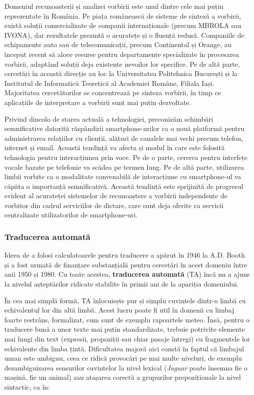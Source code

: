 \begin{multicols}{2}
Domeniul recunoașterii și analizei vorbirii este unul dintre cele mai puțin reprezentate în România. Pe piața românească de sisteme de sinteză a vorbirii, există soluții comercializate de companii internaționale (precum MBROLA sau IVONA), dar rezultatele prezintă o acuratețe și o fluență redusă. Companiile de echipamente auto sau de telecomunicații, precum Continental și Orange, au început recent să aloce resurse pentru departamente specializate în procesarea vorbirii, adaptând soluții deja existente nevoilor lor specifice. Pe de altă parte, cercetări în această direcție au loc la Universitatea Politehnica București și la Institutul de Informatică Teoretică al Academiei Române, Filiala Iași. Majoritatea cercetătorilor se concentrează pe sinteza vorbirii, în timp ce aplicațiile de interpretare a vorbirii sunt mai puțin dezvoltate.

Privind dincolo de starea actuală a tehnologiei, preconizăm schimbări semnificative datorită răspândirii smartphone-urilor ca o nouă platformă pentru administrarea relațiilor cu clienții, alături de canalele mai vechi precum telefon, internet și email. Această tendință va afecta și modul în care este folosită tehnologia pentru interacțiunea prin voce. Pe de o parte, cererea pentru interfețe vocale bazate pe telefonie va scădea pe termen lung. Pe de altă parte, utilizarea limbii vorbite ca o modalitate convenabilă de interacțiune cu smartphone-ul va căpăta o importanță semnificativă. Această tendință este sprijinită de progresul evident al acurateței sistemelor de recunoaștere a vorbirii independente de vorbitor din cadrul serviciilor de dictare, care sunt deja oferite ca servicii centralizate utilizatorilor de smartphone-uri.

\subsubsection{Traducerea automată}

Ideea de a folosi calculatoarele pentru traducere a apărut în 1946 la A.D. Booth și a fost urmată de finanțare substanțială pentru cercetări în acest domeniu între anii 1950 și 1980. Cu toate acestea, \textbf{traducerea automată} (TA) încă nu a ajuns la nivelul așteptărilor ridicate stabilite în primii ani de la apariția domeniului.


În cea mai simplă formă, TA înlocuiește pur și simplu cuvintele dintr-o limbă cu echivalentul lor din altă limbă. Acest lucru poate fi util în domenii cu limbaj foarte restrâns, formalizat, cum sunt de exemplu rapoartele meteo. Însă, pentru o traducere bună a unor texte mai puțin standardizate, trebuie potrivite elemente mai lungi din text (expresii, propoziții sau chiar pasaje întregi) cu fragmentele lor echivalente din limba țintă. Dificultatea majoră aici constă în faptul că limbajul uman este ambiguu, ceea ce ridică provocări pe mai multe niveluri, de exemplu dezambiguizarea sensurilor cuvintelor la nivel lexical (\textit{Jaguar} poate însemna fie o mașină, fie un animal) sau atașarea corectă a grupurilor prepoziționale la nivel sintactic, ca în:


\end{multicols}
